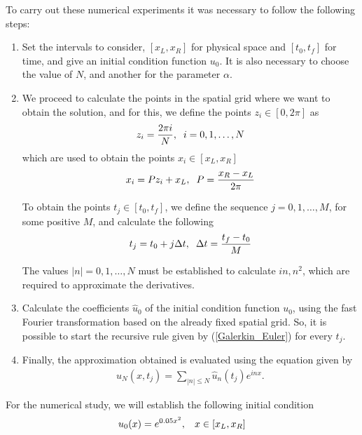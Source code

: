 		To carry out these numerical experiments it was necessary to follow the following steps:
		\begin{enumerate}
			\item Set the intervals to consider, $[x_L, x_R]$ for physical space and $[t_0, t_f]$ for time, and give an initial condition function $u_0$. It is also necessary to choose the value of $N$, and another for the parameter $\alpha$. 
			
			\item We proceed to calculate the points in the spatial grid where we want to obtain the solution, and for this, we define the points $z_i \in [0, 2 \pi]$ as
			\begin{align*}
				z_i = \frac{2 \pi i}{N}, \hspace{2mm} i = 0, 1, \dots, N
			\end{align*}
			which are used to obtain the points $x_i \in [x_L, x_R]$
			\begin{align*}
				x_i = P z_i + x_L, \hspace{2mm} P = \frac{x_R - x_L}{2 \pi}
			\end{align*}
			
			To obtain the points $t_j \in [t_0, t_f]$, we define the sequence $j = 0, 1, \dots, M$, for some positive $M$, and calculate the following
			\begin{align*}
				t_j = t_0 + j \Delta t, \hspace{2mm} \Delta t = \frac{t_f - t_0}{M} 
			\end{align*}
			
			The values $| n | = 0, 1, \dots, N $ must be established to calculate $in, n^2$, which are required to approximate the derivatives.
			 
			\item Calculate the coefficients $\hat{u}_0$ of the initial condition function $u_0$, using the fast Fourier transformation based on the already fixed spatial grid. So, it is possible to start the recursive rule given by (\ref{Galerkin_Euler}) for every $t_j$.
			
			\item Finally, the approximation obtained is evaluated using the equation given by
			\begin{align*}
				u_N(x, t_j) = \displaystyle \sum_{|n| \leq N} \hat{u}_n (t_j) e^{inx}.
			\end{align*}
		\end{enumerate}
		
		For the numerical study, we will establish the following initial condition
		\begin{align}
			\label{IC}
			u_0 (x) = e^{0.05 x^2}, \hspace{3mm} x \in [x_L, x_R] 
		\end{align}	
		
